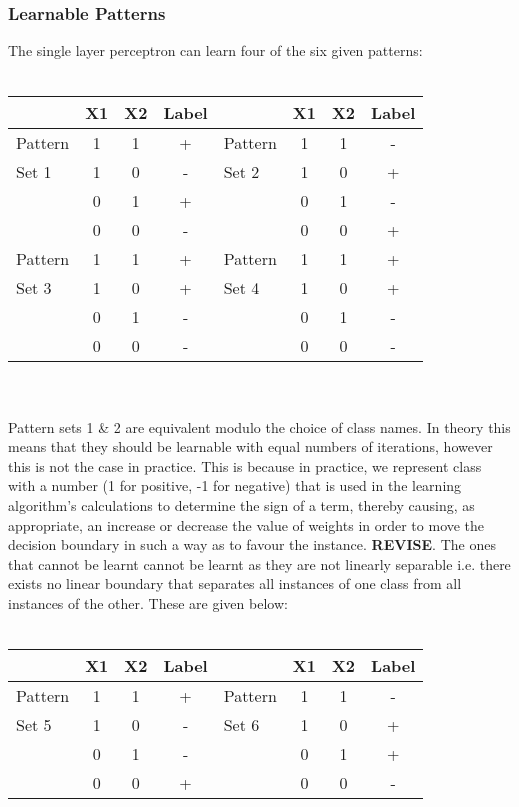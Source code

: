 \documentclass{article}
\begin{document}
\subsubsection*{Learnable Patterns}
The single layer perceptron can learn four of the six given patterns:
\\\\
\begin{tabular}{ l | c c c | l | c c c }
            & X1 & X2 & Label &         & X1 & X2 & Label \\
    \hline
    Pattern & 1  & 1  & +     & Pattern & 1  & 1  & -     \\
    Set 1   & 1  & 0  & -     & Set 2   & 1  & 0  & +     \\
            & 0  & 1  & +     &         & 0  & 1  & -     \\
            & 0  & 0  & -     &         & 0  & 0  & +     \\
    \hline
    Pattern & 1  & 1  & +     & Pattern & 1  & 1  & +     \\
    Set 3   & 1  & 0  & +     & Set 4   & 1  & 0  & +     \\
            & 0  & 1  & -     &         & 0  & 1  & -     \\
            & 0  & 0  & -     &         & 0  & 0  & -     \\
\end{tabular}
\\\\
Pattern sets 1 \& 2 are equivalent modulo the choice of class names. In theory this means that they should be learnable with equal numbers of iterations, however this is not the case in practice. This is because in practice, we represent class with a number (1 for positive, -1 for negative) that is used in the learning algorithm's calculations to determine the sign of a term, thereby causing, as appropriate, an increase or decrease the value of weights in order to move the decision boundary in such a way as to favour the instance. \textbf{REVISE}. The ones that cannot be learnt cannot be learnt as they are not linearly separable i.e. there exists no linear boundary that separates all instances of one class from all instances of the other. These are given below:
\\\\
\begin{tabular}{ l | c c c | l | c c c }
            & X1 & X2 & Label &         & X1 & X2 & Label \\
    \hline
    Pattern & 1  & 1  & +     & Pattern & 1  & 1  & -     \\
    Set 5   & 1  & 0  & -     & Set 6   & 1  & 0  & +     \\
            & 0  & 1  & -     &         & 0  & 1  & +     \\
            & 0  & 0  & +     &         & 0  & 0  & -     \\
\end{tabular}
\\\\
\end{document}

